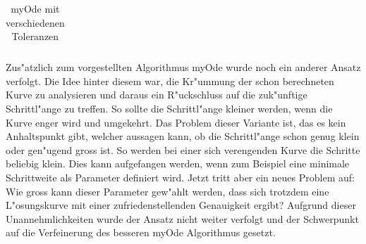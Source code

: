 \begin{refsection}
\begin{table}
\begin{tabular}{|l|l|r|}
\end{tabular}
\caption{myOde mit verschiedenen Toleranzen}
\label{table:myOdeToleranz}
\end{table}
Zus"atzlich zum vorgestellten Algorithmus myOde wurde noch ein anderer Ansatz verfolgt. Die Idee hinter diesem war, die Kr"ummung der schon berechneten Kurve zu analysieren und daraus ein R"uckschluss auf die zuk"unftige Schrittl"ange zu treffen.
So sollte die Schrittl"ange kleiner werden, wenn die Kurve enger wird und umgekehrt.
Das Problem dieser Variante ist, das es kein Anhaltspunkt gibt, welcher aussagen kann, ob die Schrittl"ange schon genug klein oder gen"ugend gross ist.
So werden bei einer sich verengenden Kurve die Schritte beliebig klein. Dies kann aufgefangen werden, wenn zum Beispiel eine minimale Schrittweite als Parameter definiert wird.
Jetzt tritt aber ein neues Problem auf: Wie gross kann dieser Parameter gew"ahlt werden, dass sich trotzdem eine L"osungskurve mit einer zufriedenstellenden Genauigkeit ergibt?
Aufgrund dieser Unannehmlichkeiten wurde der Ansatz nicht weiter verfolgt und der Schwerpunkt auf die Verfeinerung des besseren myOde Algorithmus gesetzt.  

\end{refsection}

